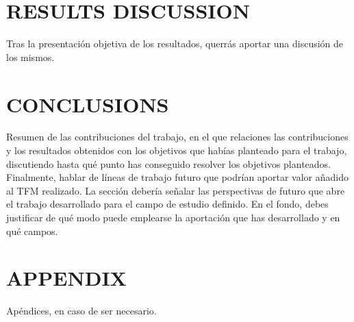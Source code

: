 \documentclass[11pt,a4paper,USenglish,twocolumn]{article}
\begin{document}
\section{RESULTS DISCUSSION}

Tras la presentación objetiva de los resultados, querrás aportar una discusión de los mismos.

\section{CONCLUSIONS}

Resumen de las contribuciones del trabajo, en el que relaciones las contribuciones y los resultados obtenidos con los objetivos que habías planteado para el trabajo, discutiendo hasta qué punto has conseguido resolver los objetivos planteados.
Finalmente, hablar de líneas de trabajo futuro que podrían aportar valor añadido al TFM realizado. La sección debería señalar las perspectivas de futuro que abre el trabajo desarrollado para el campo de estudio definido. En el fondo, debes justificar de qué modo puede emplearse la aportación que has desarrollado y en qué campos.

\appendix
\section{APPENDIX}
Apéndices, en caso de ser necesario.

\renewcommand{\refname}{REFERENCES}


\end{document}
